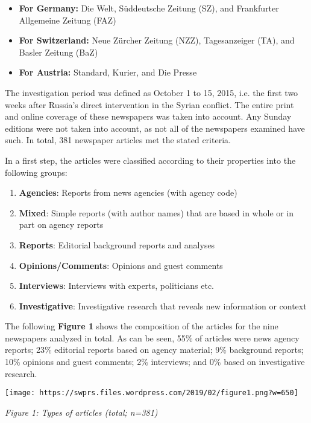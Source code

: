 \begin{itemize}
\tightlist
\item
  \textbf{For Germany:} Die Welt, Süddeutsche Zeitung (SZ), and
  Frankfurter Allgemeine Zeitung (FAZ)
\item
  \textbf{For Switzerland:} Neue Zürcher Zeitung (NZZ), Tagesanzeiger
  (TA), and Basler Zeitung (BaZ)
\item
  \textbf{For Austria:} Standard, Kurier, and Die Presse
\end{itemize}

The investigation period was defined as October 1 to 15, 2015, i.e. the
first two weeks after Russia's direct intervention in the Syrian
conflict. The entire print and online coverage of these newspapers was
taken into account. Any Sunday editions were not taken into account, as
not all of the newspapers examined have such. In total, 381 newspaper
articles met the stated criteria.

In a first step, the articles were classified according to their
properties into the following groups:

\begin{enumerate}
\def\labelenumi{\arabic{enumi}.}
\tightlist
\item
  \textbf{Agencies}: Reports from news agencies (with agency code)
\item
  \textbf{Mixed}: Simple reports (with author names) that are based in
  whole or in part on agency reports
\item
  \textbf{Reports}: Editorial background reports and analyses
\item
  \textbf{Opinions/Comments}: Opinions and guest comments
\item
  \textbf{Interviews}: Interviews with experts, politicians etc.
\item
  \textbf{Investigative}: Investigative research that reveals new
  information or context
\end{enumerate}

The following \textbf{Figure 1} shows the composition of the articles
for the nine newspapers analyzed in total. As can be seen, 55\% of
articles were news agency reports; 23\% editorial reports based on
agency material; 9\% background reports; 10\% opinions and guest
comments; 2\% interviews; and 0\% based on investigative research.

\texttt{[image: https://swprs.files.wordpress.com/2019/02/figure1.png?w=650]}

\emph{Figure 1: Types of articles (total; n=381)}

